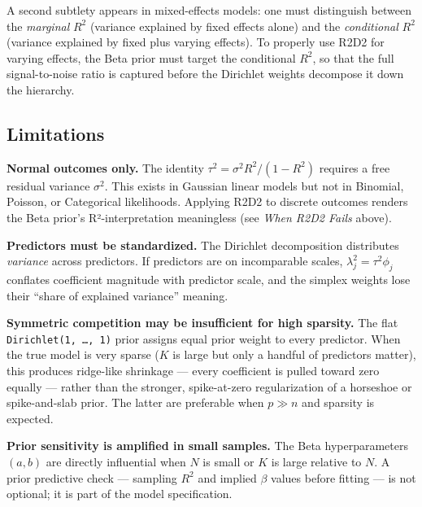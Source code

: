 \documentclass[
  letterpaper,
  DIV=11,
  numbers=noendperiod]{scrartcl}
\begin{document}
A second subtlety appears in mixed-effects models: one must distinguish
between the \emph{marginal} \(R^2\) (variance explained by fixed effects
alone) and the \emph{conditional} \(R^2\) (variance explained by fixed
plus varying effects). To properly use R2D2 for varying effects, the
Beta prior must target the conditional \(R^2\), so that the full
signal-to-noise ratio is captured before the Dirichlet weights decompose
it down the hierarchy.

\subsection{Limitations}\label{limitations}

\begin{tcolorbox}[enhanced jigsaw, titlerule=0mm, arc=.35mm, leftrule=.75mm, colback=white, bottomtitle=1mm, toptitle=1mm, colbacktitle=quarto-callout-warning-color!10!white, colframe=quarto-callout-warning-color-frame, opacitybacktitle=0.6, bottomrule=.15mm, opacityback=0, toprule=.15mm, left=2mm, title=\textcolor{quarto-callout-warning-color}{\faExclamationTriangle}\hspace{0.5em}{Warning}, rightrule=.15mm, breakable, coltitle=black]

\textbf{Normal outcomes only.} The identity
\(\tau^2 = \sigma^2 R^2/(1-R^2)\) requires a free residual variance
\(\sigma^2\). This exists in Gaussian linear models but not in Binomial,
Poisson, or Categorical likelihoods. Applying R2D2 to discrete outcomes
renders the Beta prior's R²-interpretation meaningless (see \emph{When
R2D2 Fails} above).

\textbf{Predictors must be standardized.} The Dirichlet decomposition
distributes \emph{variance} across predictors. If predictors are on
incomparable scales, \(\lambda_j^2 = \tau^2 \phi_j\) conflates
coefficient magnitude with predictor scale, and the simplex weights lose
their ``share of explained variance'' meaning.

\textbf{Symmetric competition may be insufficient for high sparsity.}
The flat \texttt{Dirichlet(1,\ …,\ 1)} prior assigns equal prior weight
to every predictor. When the true model is very sparse (\(K\) is large
but only a handful of predictors matter), this produces ridge-like
shrinkage --- every coefficient is pulled toward zero equally --- rather
than the stronger, spike-at-zero regularization of a horseshoe or
spike-and-slab prior. The latter are preferable when \(p \gg n\) and
sparsity is expected.

\textbf{Prior sensitivity is amplified in small samples.} The Beta
hyperparameters \((a, b)\) are directly influential when \(N\) is small
or \(K\) is large relative to \(N\). A prior predictive check ---
sampling \(R^2\) and implied \(\beta\) values before fitting --- is not
optional; it is part of the model specification.


\end{tcolorbox}
\end{document}
